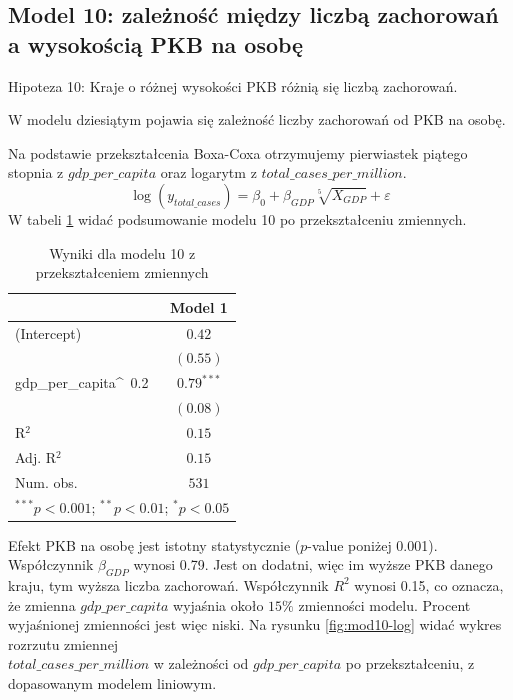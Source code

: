 \documentclass[12pt]{mwbk}
\theoremstyle{plain}
\theoremstyle{definition}
\theoremstyle{remark}
\begin{document}
\subsection{Model 10: zależność między liczbą zachorowań a wysokością PKB na osobę}

Hipoteza 10: Kraje o różnej wysokości PKB różnią się liczbą zachorowań.


W modelu dziesiątym pojawia się zależność liczby zachorowań od PKB na osobę.


Na podstawie przekształcenia Boxa-Coxa otrzymujemy pierwiastek piątego stopnia z $gdp\_per\_capita$ oraz logarytm z $total\_cases\_per\_million$.
$$\log(y_{total\_cases})=\beta_0+\beta_{GDP}\sqrt[5]{X_{GDP}}+\varepsilon$$
W tabeli \ref{table:mod10-log} widać podsumowanie modelu 10 po przekształceniu zmiennych.

\begin{table}[!htbp]
	\begin{center}
		\begin{tabular}{l c}
			\hline
			& Model 1 \\
			\hline
			(Intercept)          & $0.42$       \\
			& $(0.55)$     \\
			gdp\_per\_capita\^~0.2 & $0.79^{***}$ \\
			& $(0.08)$     \\
			\hline
			R$^2$                & $0.15$       \\
			Adj. R$^2$           & $0.15$       \\
			Num. obs.            & $531$        \\
			\hline
			\multicolumn{2}{l}{\scriptsize{$^{***}p<0.001$; $^{**}p<0.01$; $^{*}p<0.05$}}
		\end{tabular}
		\caption{Wyniki dla modelu 10 z przekształceniem zmiennych}
		\label{table:mod10-log}
	\end{center}
\end{table}

Efekt PKB na osobę jest istotny statystycznie ($p$-value poniżej 0.001). Współczynnik $\beta_{GDP}$ wynosi 0.79. Jest on dodatni, więc im wyższe PKB danego kraju, tym wyższa liczba zachorowań. Współczynnik $R^2$ wynosi 0.15, co oznacza, że zmienna $gdp\_per\_capita$ wyjaśnia około $15\%$ zmienności modelu. Procent wyjaśnionej zmienności jest więc niski. Na rysunku \ref{fig:mod10-log} widać wykres rozrzutu zmiennej \\$total\_cases\_per\_million$ w zależności od $gdp\_per\_capita$ po przekształceniu, z dopasowanym modelem liniowym.
\end{document}
